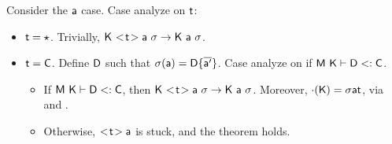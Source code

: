 \documentclass[acmlarge, anonymous, authordraft]{acmart}
\begin{document}
\begin{itemize}
      Consider the ${\sf{a}}$ case. Case analyze on $\t$:
      \begin{itemize}
        \item $\t = \any$. Trivially, $\Reduce\K{\SubCast\t\a}\s \K\a\s$.
        \item $\t = \C$. Define ${\sf{D}}$ such that $\sigma({\sf{a}}) = {\sf{D}}\{\overline{{\sf{a}}'}\}$. Case analyze on if ${\sf{M}}~{\sf{K}}\vdash {\sf{D}}<: {\sf{C}}$.
        \begin{itemize}
          \item If ${\sf{M}}~{\sf{K}}\vdash {\sf{D}}<: {\sf{C}}$, then $\Reduce\K{\SubCast\t\a}\s \K\a\s$. Moreover, $\HasType\cdot\K\s\a\t$, via  and .
          \item Otherwise, $\SubCast\t\a$ is stuck, and the theorem holds.
        \end{itemize}
      \end{itemize}
      

\end{itemize}
\end{document}
